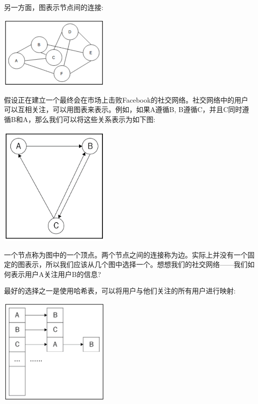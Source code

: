 另一方面，图表示节点间的连接: \par

\begin{center}
	\includegraphics[width=0.4\textwidth]{content/Section-2/Chapter-6/27}
\end{center}

假设正在建立一个最终会在市场上击败Facebook的社交网络。社交网络中的用户可以互相关注，可以用图表来表示。例如，如果A遵循B, B遵循C，并且C同时遵循B和A，那么我们可以将这些关系表示为如下图: \par

\begin{center}
	\includegraphics[width=0.4\textwidth]{content/Section-2/Chapter-6/28}
\end{center}

一个节点称为图中的一个顶点。两个节点之间的连接称为边。实际上并没有一个固定的图表示，所以我们应该从几个图中选择一个。想想我们的社交网络——我们如何表示用户A关注用户B的信息? \par
最好的选择之一是使用哈希表，可以将用户与他们关注的所有用户进行映射: \par

\begin{center}
	\includegraphics[width=0.4\textwidth]{content/Section-2/Chapter-6/29}
\end{center}

